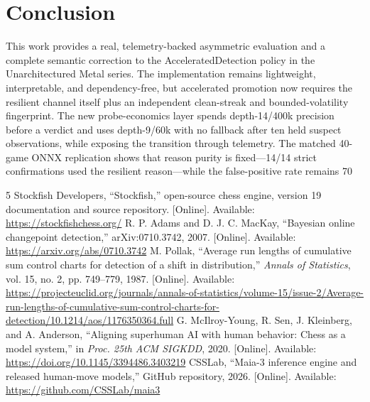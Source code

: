 \documentclass[conference]{IEEEtran}
\begin{document}
\section{Conclusion}
This work provides a real, telemetry-backed asymmetric evaluation and a complete semantic correction to the AcceleratedDetection policy in the Unarchitectured Metal series. The implementation remains lightweight, interpretable, and dependency-free, but accelerated promotion now requires the resilient channel itself plus an independent clean-streak and bounded-volatility fingerprint. The new probe-economics layer spends depth-14/400k precision before a verdict and uses depth-9/60k with no fallback after ten held suspect observations, while exposing the transition through telemetry. The matched 40-game ONNX replication shows that reason purity is fixed—14/14 strict confirmations used the resilient reason—while the false-positive rate remains 70%

\balance
\begin{thebibliography}{5}
 Stockfish Developers, ``Stockfish,'' open-source chess engine, version 19 documentation and source repository. [Online]. Available: \url{https://stockfishchess.org/}
 R. P. Adams and D. J. C. MacKay, ``Bayesian online changepoint detection,'' arXiv:0710.3742, 2007. [Online]. Available: \url{https://arxiv.org/abs/0710.3742}
 M. Pollak, ``Average run lengths of cumulative sum control charts for detection of a shift in distribution,'' \emph{Annals of Statistics}, vol. 15, no. 2, pp. 749--779, 1987. [Online]. Available: \url{https://projecteuclid.org/journals/annals-of-statistics/volume-15/issue-2/Average-run-lengths-of-cumulative-sum-control-charts-for-detection/10.1214/aos/1176350364.full}
 G. McIlroy-Young, R. Sen, J. Kleinberg, and A. Anderson, ``Aligning superhuman AI with human behavior: Chess as a model system,'' in \emph{Proc. 25th ACM SIGKDD}, 2020. [Online]. Available: \url{https://doi.org/10.1145/3394486.3403219}
 CSSLab, ``Maia-3 inference engine and released human-move models,'' GitHub repository, 2026. [Online]. Available: \url{https://github.com/CSSLab/maia3}
\end{thebibliography}
\end{document}
